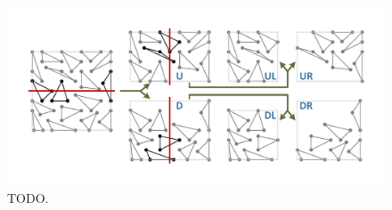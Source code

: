 \begin{figure}[h]
\includegraphics[width=1.0\textwidth]{pics/pic_box_size.pdf}
\caption{TODO.}\label{fig:pic_box}
\end{figure}

